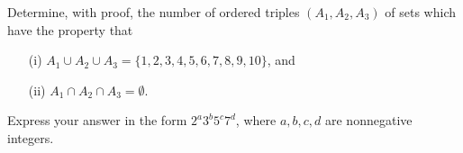 Determine, with proof, the number of ordered triples $(A_1, A_2, A_3)$
of sets which have the property that
\begin{enumerate}
\item[(i)] $A_1 \cup A_2 \cup A_3 = \{1,2,3,4,5,6,7,8,9,10\}$, and
\item[(ii)] $A_1 \cap A_2 \cap A_3 = \emptyset$.
\end{enumerate}
Express your answer in the form $2^a 3^b 5^c 7^d$, where $a,b,c,d$
are nonnegative integers.
